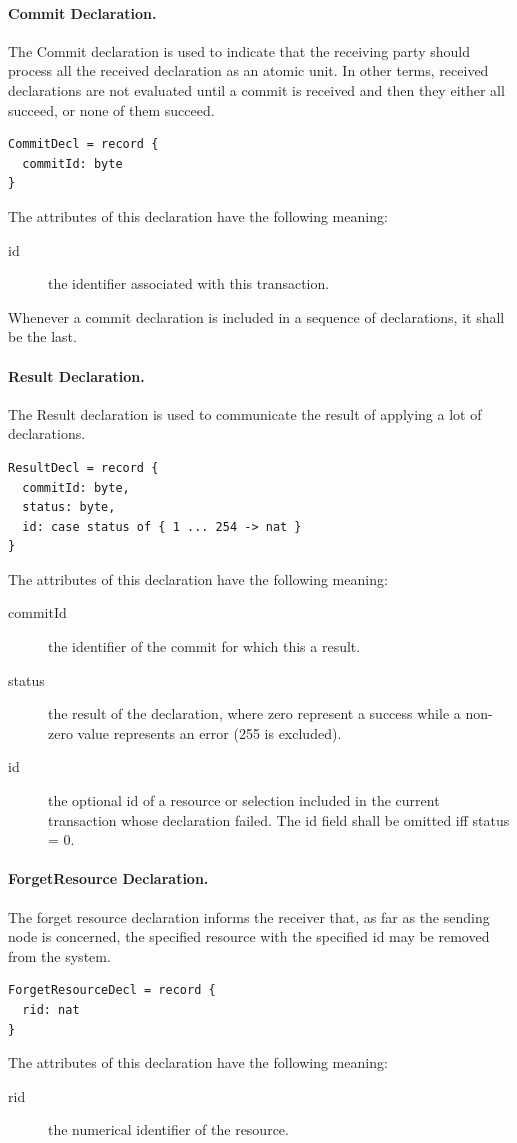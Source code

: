 \documentclass[a4paper,oneside,article]{memoir}
\begin{document}
\paragraph{Commit Declaration.} The Commit declaration is used to indicate that the receiving party
should process all the received declaration as an atomic unit.  In other terms, received
declarations are not evaluated until a commit is received and then they either all succeed, or none
of them succeed.
\begin{verbatim}
CommitDecl = record {
  commitId: byte
}
\end{verbatim}
The attributes of this declaration have the following meaning:
\begin{description}
\item[id] the identifier associated with this transaction.
\end{description}
Whenever a commit declaration is included in a sequence of declarations, it shall be the last.

\paragraph{Result Declaration.} The Result declaration is used to communicate the result of
applying a lot of declarations.
\begin{verbatim}
ResultDecl = record {
  commitId: byte,
  status: byte,
  id: case status of { 1 ... 254 -> nat }
}
\end{verbatim}
The attributes of this declaration have the following meaning:
\begin{description}
\item[commitId] the identifier of the commit for which this a result.
\item[status] the result of the declaration, where zero represent a success while a non-zero value
  represents an error (255 is excluded).
\item[id] the optional id of a resource or selection included in the current transaction whose
  declaration failed.  The id field shall be omitted iff status = 0.
\end{description}

\paragraph{ForgetResource Declaration.} The forget resource declaration informs the receiver that,
as far as the sending node is concerned, the specified resource with the specified id may be removed
from the system.
\begin{verbatim}
ForgetResourceDecl = record {
  rid: nat
}
\end{verbatim}
The attributes of this declaration have the following meaning:
\begin{description}
\item[rid] the numerical identifier of the resource.
\end{description}
\end{document}
